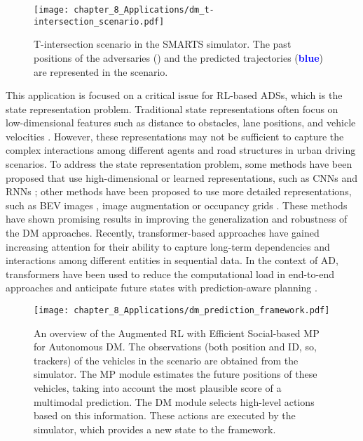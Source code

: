 \begin{figure}[h]
	\centering
	\texttt{[image: chapter\_8\_Applications/dm\_t-intersection\_scenario.pdf]}
	\captionsetup{justification=justified}
	\caption[T-intersection scenario in the \ac{SMARTS} simulator]{T-intersection scenario in the \ac{SMARTS} simulator. The past positions of the adversaries (\textbf{\color{YellowOrange}{yellow}}) and the predicted trajectories (\textbf{\textcolor{blue}{blue}}) are represented in the scenario.}
	\label{fig:chapter_8_Applications/dm_t-intersection_scenario}
\end{figure}

This application is focused on a critical issue for \ac{RL}-based \acp{ADS}, which is the state representation problem. Traditional state representations often focus on low-dimensional features such as distance to obstacles, lane positions, and vehicle velocities \cite{Rodrigo2023}. However, these representations may not be sufficient to capture the complex interactions among different agents and road structures in urban driving scenarios. To address the state representation problem, some methods have been proposed that use high-dimensional or learned representations, such as \acp{CNN} \cite{Johan2018} and \acp{RNN} \cite{Tram2018}; other methods have been proposed to use more detailed representations, such as  \ac{BEV} images \cite{zhang2021endtoend}, image augmentation \cite{kostrikov2021image} or occupancy grids \cite{moghadam2019hierarchical}. These methods have shown promising results in improving the generalization and robustness of the \ac{DM} approaches. Recently, transformer-based approaches have gained increasing attention for their ability to capture long-term dependencies and interactions among different entities in sequential data. In the context of \ac{AD}, transformers have been used to reduce the computational load in end-to-end approaches \cite{Li4} and anticipate future states with prediction-aware planning \cite{valiente2022predictionaware}.

\begin{figure}[h]
	\centering        
	\texttt{[image: chapter\_8\_Applications/dm\_prediction\_framework.pdf]}
	\captionsetup{justification=justified}
	\caption[An overview of the Augmented \ac{RL} with Efficient Social-based \ac{MP} for Autonomous \ac{DM}]{An overview of the Augmented \ac{RL} with Efficient Social-based \ac{MP} for Autonomous \ac{DM}. The observations (both position and ID, so, trackers) of the vehicles in the scenario are obtained from the simulator. The MP module estimates the future positions of these vehicles, taking into account the most plausible score of a multimodal prediction. The \ac{DM} module selects high-level actions based on this information. These actions are executed by the simulator, which provides a new state to the framework.}
	\label{fig:chapter_8_Applications/dm_prediction_framework}
\end{figure}

